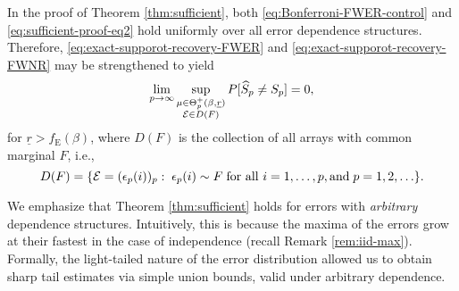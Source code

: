 \begin{remark} \label{rmk:sufficient-strengthened}
In the proof of Theorem \ref{thm:sufficient}, both \eqref{eq:Bonferroni-FWER-control} and \eqref{eq:sufficient-proof-eq2} hold uniformly over all error dependence structures.
Therefore, \eqref{eq:exact-supporot-recovery-FWER} and \eqref{eq:exact-supporot-recovery-FWNR} may be strengthened to yield
\begin{equation} \label{eq:exact-supporot-recovery-strengthened}
    \lim_{p\to\infty}\sup_{\substack{\mu\in\Theta_p^+(\beta, \underline{r})\\ {\cal E}\in D(F)}} P[\widehat{S}_p \neq S_p] = 0,
\end{equation}
for $\underline{r} > f_{\mathrm{E}}(\beta)$, where $D(F)$ is the collection of all arrays with common marginal $F$, i.e., 
\begin{equation} \label{eq:common-marginal-distribution}
    D(F)=\{{\cal E}=(\epsilon_p(i))_p:\;\epsilon_p(i)\sim F\;\text{for all }i=1,\ldots,p, \text{and}\; p=1,2,\ldots\}.
\end{equation}
\end{remark}

\begin{remark}
We emphasize that Theorem \ref{thm:sufficient} holds for errors with \emph{arbitrary} dependence structures. 
Intuitively, this is because the maxima of the errors grow at their fastest in the case of independence (recall Remark \ref{rem:iid-max}). 
Formally, the light-tailed nature of the error distribution allowed us to obtain sharp tail estimates via simple union bounds, 
valid under arbitrary dependence.
\end{remark}


